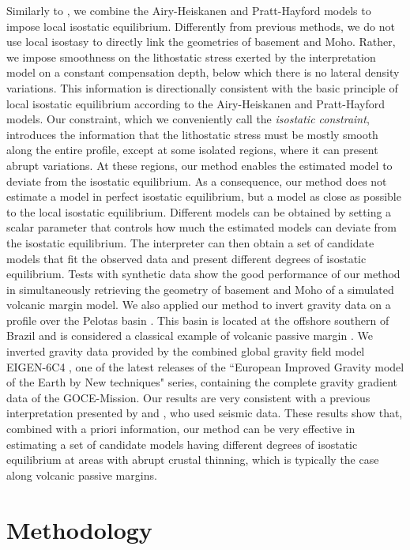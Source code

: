 \documentclass[manuscript]{geophysics}
\begin{document}
Similarly to \citet{ferderer-etal2017}, we combine the Airy-Heiskanen and Pratt-Hayford
models to impose local isostatic equilibrium.
Differently from previous methods, we do not use local isostasy to directly link
the geometries of basement and Moho.
Rather, we impose smoothness on the lithostatic stress exerted by the interpretation 
model on a constant compensation depth, below which there is no lateral density variations.
This information is directionally consistent with the basic principle of 
local isostatic equilibrium according to the Airy-Heiskanen and Pratt-Hayford models.
Our constraint, which we conveniently call the \textit{isostatic constraint},
introduces the information that the lithostatic stress must be mostly smooth along the 
entire profile, except at some isolated regions, where it can present abrupt variations.
At these regions, our method enables the estimated model to deviate from the 
isostatic equilibrium.
As a consequence, our method does not estimate a model in perfect isostatic equilibrium, 
but a model as close as possible to the local isostatic equilibrium. 
Different models can be obtained by setting a scalar parameter that controls 
how much the estimated models can deviate from the isostatic equilibrium.
The interpreter can then obtain a set of candidate models that fit the observed data
and present different degrees of isostatic equilibrium.
Tests with synthetic data show the good performance of our method in simultaneously
retrieving the geometry of basement and Moho of a simulated volcanic margin
model. We also applied our method to invert 
gravity data on a profile over the Pelotas basin \citep{stica-etal2014}. This basin is
located at the offshore southern of Brazil and is considered a classical example 
of volcanic passive margin \citep{geoffroy2005}. 
We inverted gravity data provided by the combined global gravity field model EIGEN-6C4
\citep{forste2014}, one of the latest releases of the ``European Improved Gravity model of 
the Earth by New techniques" series, containing the complete gravity gradient data of the 
GOCE-Mission.
Our results are very consistent with a previous
interpretation presented by \citet{stica-etal2014} and
\citet{zalan2015}, who used seismic data.
These results show that, combined with a priori information, our method can be very effective in 
estimating a set of candidate models having different degrees of isostatic equilibrium at
areas with abrupt crustal thinning, which is typically the case along volcanic passive margins.


\section{Methodology}
\end{document}
